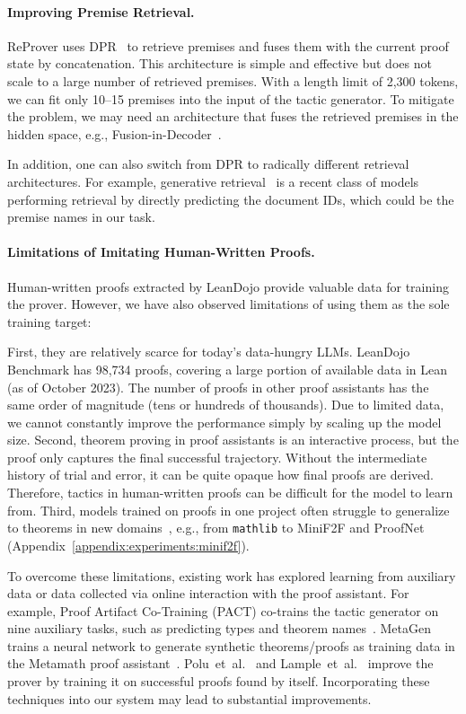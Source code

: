 \documentclass{article}
\newcommand{\smallsec}[1]{\vspace{-1mm} \paragraph{#1.}}
\newcommand\name{ReProver}
\newcommand\numproofs{98,734}
\begin{document}
\smallsec{Improving Premise Retrieval}
{\name} uses DPR~\cite{karpukhin2020dense} to retrieve premises and fuses them with the current proof state by concatenation. This architecture is simple and effective but does not scale to a large number of retrieved premises. With a length limit of 2,300 tokens, we can fit only 10--15 premises into the input of the tactic generator. To mitigate the problem, we may need an architecture that fuses the retrieved premises in the hidden space, e.g., Fusion-in-Decoder~\cite{izacard2021leveraging}.

In addition, one can also switch from DPR to radically different retrieval architectures. For example, generative retrieval~\cite{tay2022transformer,bevilacqua2022autoregressive,pradeep2023does} is a recent class of models performing retrieval by directly predicting the document IDs, which could be the premise names in our task.


\smallsec{Limitations of Imitating Human-Written Proofs}
Human-written proofs extracted by LeanDojo provide valuable data for training the prover. However, we have also observed limitations of using them as the sole training target:

First, they are relatively scarce for today's data-hungry LLMs. LeanDojo Benchmark has {\numproofs} proofs, covering a large portion of available data in Lean (as of October 2023). The number of proofs in other proof assistants has the same order of magnitude (tens or hundreds of thousands). Due to limited data, we cannot constantly improve the performance simply by scaling up the model size. Second, theorem proving in proof assistants is an interactive process, but the proof only captures the final successful trajectory. Without the intermediate history of trial and error, it can be quite opaque how final proofs are derived. Therefore, tactics in human-written proofs can be difficult for the model to learn from. Third, models trained on proofs in one project often struggle to generalize to theorems in new domains~\cite{yang2019learning,first2023baldur}, e.g., from \texttt{mathlib} to MiniF2F and ProofNet (Appendix~\ref{appendix:experiments:minif2f}).


To overcome these limitations, existing work has explored learning from auxiliary data or data collected via online interaction with the proof assistant. For example, Proof Artifact Co-Training (PACT) co-trains the tactic generator on nine auxiliary tasks, such as predicting types and theorem names~\cite{han2022proof}. MetaGen~\cite{wang2020learning} trains a neural network to generate synthetic theorems/proofs as training data in the Metamath proof assistant~\cite{megill2019metamath}. Polu~et~al.~\cite{polu2023formal} and Lample~et~al.~\cite{lample2022hypertree} improve the prover by training it on successful proofs found by itself. Incorporating these techniques into our system may lead to substantial improvements.




\end{document}

